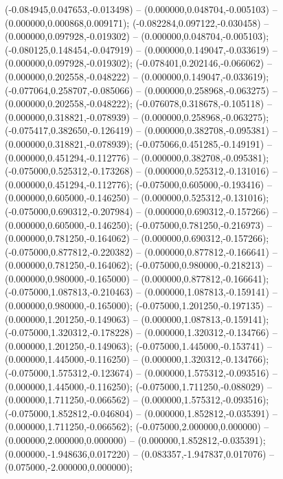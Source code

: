  (-0.084945,0.047653,-0.013498) -- (0.000000,0.048704,-0.005103) -- (0.000000,0.000868,0.009171);
 (-0.082284,0.097122,-0.030458) -- (0.000000,0.097928,-0.019302) -- (0.000000,0.048704,-0.005103);
 (-0.080125,0.148454,-0.047919) -- (0.000000,0.149047,-0.033619) -- (0.000000,0.097928,-0.019302);
 (-0.078401,0.202146,-0.066062) -- (0.000000,0.202558,-0.048222) -- (0.000000,0.149047,-0.033619);
 (-0.077064,0.258707,-0.085066) -- (0.000000,0.258968,-0.063275) -- (0.000000,0.202558,-0.048222);
 (-0.076078,0.318678,-0.105118) -- (0.000000,0.318821,-0.078939) -- (0.000000,0.258968,-0.063275);
 (-0.075417,0.382650,-0.126419) -- (0.000000,0.382708,-0.095381) -- (0.000000,0.318821,-0.078939);
 (-0.075066,0.451285,-0.149191) -- (0.000000,0.451294,-0.112776) -- (0.000000,0.382708,-0.095381);
 (-0.075000,0.525312,-0.173268) -- (0.000000,0.525312,-0.131016) -- (0.000000,0.451294,-0.112776);
 (-0.075000,0.605000,-0.193416) -- (0.000000,0.605000,-0.146250) -- (0.000000,0.525312,-0.131016);
 (-0.075000,0.690312,-0.207984) -- (0.000000,0.690312,-0.157266) -- (0.000000,0.605000,-0.146250);
 (-0.075000,0.781250,-0.216973) -- (0.000000,0.781250,-0.164062) -- (0.000000,0.690312,-0.157266);
 (-0.075000,0.877812,-0.220382) -- (0.000000,0.877812,-0.166641) -- (0.000000,0.781250,-0.164062);
 (-0.075000,0.980000,-0.218213) -- (0.000000,0.980000,-0.165000) -- (0.000000,0.877812,-0.166641);
 (-0.075000,1.087813,-0.210463) -- (0.000000,1.087813,-0.159141) -- (0.000000,0.980000,-0.165000);
 (-0.075000,1.201250,-0.197135) -- (0.000000,1.201250,-0.149063) -- (0.000000,1.087813,-0.159141);
 (-0.075000,1.320312,-0.178228) -- (0.000000,1.320312,-0.134766) -- (0.000000,1.201250,-0.149063);
 (-0.075000,1.445000,-0.153741) -- (0.000000,1.445000,-0.116250) -- (0.000000,1.320312,-0.134766);
 (-0.075000,1.575312,-0.123674) -- (0.000000,1.575312,-0.093516) -- (0.000000,1.445000,-0.116250);
 (-0.075000,1.711250,-0.088029) -- (0.000000,1.711250,-0.066562) -- (0.000000,1.575312,-0.093516);
 (-0.075000,1.852812,-0.046804) -- (0.000000,1.852812,-0.035391) -- (0.000000,1.711250,-0.066562);
 (-0.075000,2.000000,0.000000) -- (0.000000,2.000000,0.000000) -- (0.000000,1.852812,-0.035391);
 (0.000000,-1.948636,0.017220) -- (0.083357,-1.947837,0.017076) -- (0.075000,-2.000000,0.000000);
